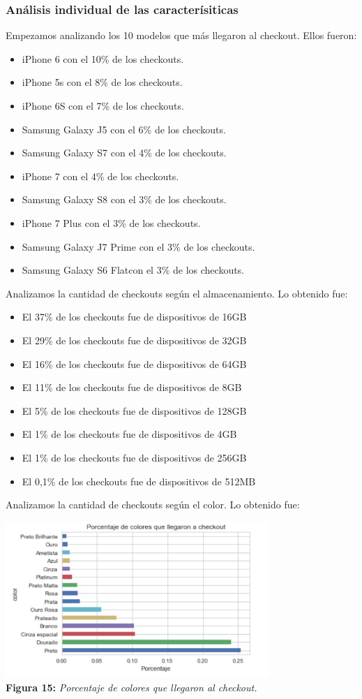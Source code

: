 \documentclass[titlepage,a4paper]{article}
\begin{document}
	\subsubsection{Análisis individual de las caracterísiticas}
	Empezamos analizando los 10 modelos que más llegaron al checkout. Ellos fueron:
	\begin{itemize}
	\item iPhone 6 con el 10\% de los checkouts.
	\item iPhone 5s con el 8\% de los checkouts.
	\item iPhone 6S  con el 7\% de los checkouts.
	\item Samsung Galaxy J5 con el 6\% de los checkouts.
	\item Samsung Galaxy S7 con el 4\% de los checkouts.
	\item iPhone 7 con el 4\% de los checkouts.
	\item Samsung Galaxy S8 con el 3\% de los checkouts.
	\item iPhone 7 Plus con el 3\% de los checkouts.
	\item Samsung Galaxy J7 Prime con el 3\% de los checkouts.
	\item Samsung Galaxy S6 Flatcon el 3\% de los checkouts.
	\end{itemize}
	Analizamos la cantidad de checkouts según el almacenamiento. Lo obtenido fue:
	\begin{itemize}
	\item El 37\% de los checkouts fue de dispositivos de 16GB
	\item El 29\% de los checkouts fue de dispositivos de 32GB
	\item	El 16\% de los checkouts fue de dispositivos de 64GB
	\item	El 11\% de los checkouts fue de dispositivos de 8GB
	\item	El 5\% de los checkouts fue de dispositivos de 128GB
	\item	El 1\% de los checkouts fue de dispositivos de 4GB
	\item	El 1\% de los checkouts fue de dispositivos de 256GB
	\item	El 0,1\% de los checkouts fue de dispositivos de 512MB
	\end{itemize}
	Analizamos la cantidad de checkouts según el color. Lo obtenido fue:
	\begin{center}
	\includegraphics[width=10cm] {porcentajeDeColoresQueLlegaronACheck.jpg}\\
	\textbf{Figura 15:}  \textit{Porcentaje de colores que llegaron al checkout.}
	\end{center}
\end{document}

